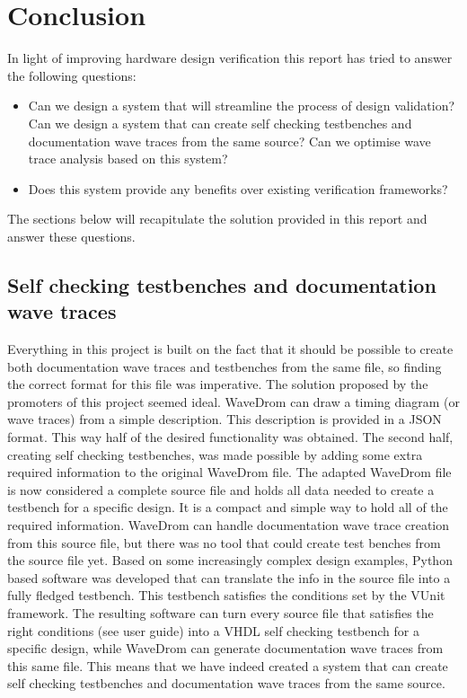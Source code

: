 
\chapter{Conclusion}
In light of improving hardware design verification this report has tried to answer the following questions:
\begin{itemize}
	\item Can we design a system that will streamline the process of design validation?
	\subitem Can we design a system that can create self checking testbenches and documentation wave traces from the same source?
	\subitem Can we optimise wave trace analysis based on this system?
	\item Does this system provide any benefits over existing verification frameworks?	
\end{itemize}
The sections below will recapitulate the solution provided in this report and answer these questions.
\section{Self checking testbenches and documentation wave traces}
Everything in this project is built on the fact that it should be possible to create both documentation wave traces and testbenches from the same file, so finding the correct format for this file was imperative. The solution proposed by the promoters of this project seemed ideal. WaveDrom can draw a timing diagram (or wave traces) from a simple description. This description is provided in a JSON format. This way half of the desired functionality was obtained. The second half, creating self checking testbenches, was made possible by adding some extra required information to the original WaveDrom file. The adapted WaveDrom file is now considered a complete source file and holds all data needed to create a testbench for a specific design. It is a compact and simple way to hold all of the required information.
\npar
WaveDrom can handle documentation wave trace creation from this source file, but there was no tool that could create test benches from the source file yet. Based on some increasingly complex design examples, Python based software was developed that can translate the info in the source file into a fully fledged testbench. This testbench satisfies the conditions set by the VUnit framework.
\npar
The resulting software can turn every source file that satisfies the right conditions (see user guide) into a VHDL self checking testbench for a specific design, while WaveDrom can generate documentation wave traces from this same file. This means that we have indeed created a system that can create self checking testbenches and documentation wave traces from the same source.
